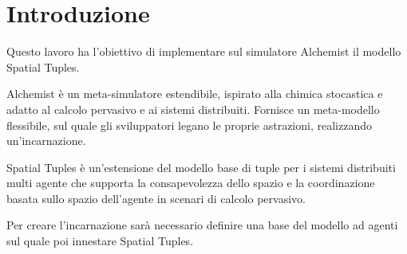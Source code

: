 \documentclass[12pt,a4paper,openright,twoside]{report}
\begin{document}
\begin{titlepage}

\thispagestyle{empty}

\topmargin=6.5cm

\raggedleft

\large

\em


\newpage

\clearpage{\pagestyle{empty}\cleardoublepage}
\end{titlepage}

\chapter*{Introduzione} %


Questo lavoro ha l'obiettivo di implementare sul simulatore Alchemist il modello Spatial Tuples.

Alchemist \`e un meta-simulatore estendibile, ispirato alla chimica stocastica e adatto al calcolo pervasivo e ai sistemi distribuiti. Fornisce un meta-modello flessibile, sul quale gli sviluppatori legano le proprie astrazioni, realizzando un'incarnazione.

Spatial Tuples \`e un'estensione del modello base di tuple per i sistemi distribuiti multi agente che supporta la consapevolezza dello spazio e la coordinazione basata sullo spazio dell'agente in scenari di calcolo pervasivo.

Per creare l'incarnazione sar\`a necessario definire una base del modello ad agenti sul quale poi innestare Spatial Tuples.

\clearpage{\pagestyle{empty}\cleardoublepage}
\end{document}
